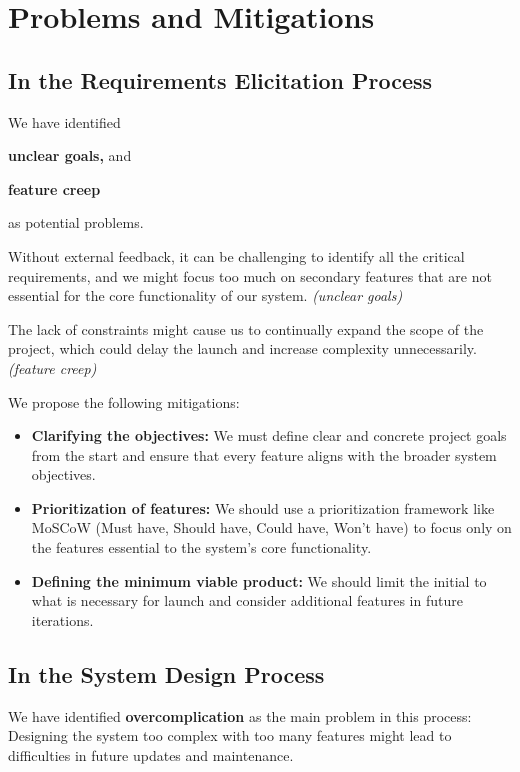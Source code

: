 \documentclass[twoside,a4paper,journal]{IEEEtran}
\begin{document}
\section{Problems and Mitigations}
\subsection{In the Requirements Elicitation Process}
We have identified
\begin{enumerate*}
  \item \textbf{unclear goals,} and
  \item \textbf{feature creep}
\end{enumerate*}
as potential problems.

Without external feedback, it can be challenging to identify all the critical
requirements, and we might focus too much on secondary features that are not
essential for the core functionality of our system.
\textit{(unclear goals)}

The lack of constraints might cause us to continually expand the scope of the
project, which could delay the launch and increase complexity unnecessarily.
\textit{(feature creep)}

We propose the following mitigations:
\begin{itemize}
  \item \textbf{Clarifying the objectives:}
    We must define clear and concrete project goals from the start and ensure that
    every feature aligns with the broader system objectives.
  \item \textbf{Prioritization of features:}
    We should use a
    prioritization framework like MoSCoW (Must have, Should have, Could have,
    Won't have) to focus only on the features essential to the system's core
    functionality.
  \item \textbf{Defining the minimum viable product:}
    We should limit the initial to what is necessary for launch and consider
    additional features in future iterations.
\end{itemize}

\subsection{In the System Design Process}
We have identified \textbf{overcomplication} as the main problem in this
process:
Designing the system too complex with too many features might lead to
difficulties in future updates and maintenance.
\end{document}
